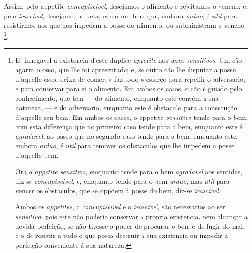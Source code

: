 Assim, pelo appetite \emph{concupiscivel}, desejamos o alimento e rejeitamos o veneno; e, pelo \emph{irascivel}, desejamos a lucta, como um bem que, embora \emph{arduo}, é \emph{util} para resistirmos aos que nos impedem a posse do alimento, ou subministram o veneno \footnote{E' innegavel a existencia d'este duplice \emph{appetite} nos seres \emph{sensitivos}. Um cão agarra o osso, que lhe foi apresentado; e, se outro cão lhe disputar a posse d'aquelle osso, deixa de comer, e faz todo o esforço para repellir o adversario, e para conservar para si o alimento. Em ambos os casos, o cão é guiado pelo conhecimento, que tem --- do alimento, emquanto este convém á sua natureza, --- e do adversario, emquanto este é obstaculo para a consecução d'aquelle seu bem. Em ambos os casos, o appetite \emph{sensitivo} tende para o bem, com esta differença que no primeiro caso tende para o bem, emquanto este é \emph{agradavel}, ao passo que no segundo caso tende para o bem, emquanto este, embora \emph{arduo}, é \emph{util} para remover os obstaculos que lhe impedem a posse d'aquelle bem.\par Ora o \emph{appetite sensitivo}, emquanto tende para o bem \emph{agradavel} aos sentidos, diz-se \emph{concupiscivel}, e, emquanto tende para o bem \emph{arduo}, mas \emph{util} para vencer os obstaculos, que se oppõem á posse do bem, diz-se \emph{irascivel}.\par Ambos os \emph{appetites}, o \emph{concupiscivel} e o \emph{irascivel}, são necessarios ao ser \emph{sensitivo}; pois este não poderia conservar a propria existencia, nem alcançar a devida perfeição, se não tivesse o poder de procurar o bem e de fugir do mal, e o de resistir a tudo o que possa destruir a sua existencia ou impedir a perfeição conveniente á sua natureza.}.


